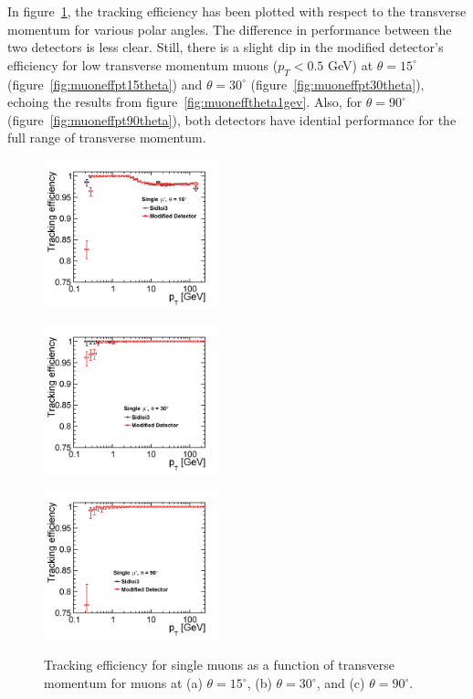 In figure~\ref{fig:muoneffpt}, the tracking efficiency has been plotted
with respect to the transverse momentum for various polar angles.
The difference in performance between the two detectors
is less clear.
Still, there is a slight dip in the modified detector's efficiency for low
transverse momentum muons ($p_{T} < 0.5$ GeV) at $\theta = 15^{\circ}$ (figure~\ref{fig:muoneffpt15theta})
and $\theta = 30^{\circ}$ (figure~\ref{fig:muoneffpt30theta}), echoing the results from figure~\ref{fig:muonefftheta1gev}.
Also, for $\theta = 90^{\circ}$ (figure~\ref{fig:muoneffpt90theta}), both detectors have idential performance for the full range of transverse momentum.
\begin{figure}[h!]
\begin{minipage}{.33\textwidth}
\centering
\includegraphics[width=2.0in]{muonEfficiencyPtComparisonTheta15.png}
\label{fig:muoneffpt15theta}
\end{minipage}%
\begin{minipage}{.33\textwidth}
\centering
\includegraphics[width=2.0in]{muonEfficiencyPtComparisonTheta30.png}
\label{fig:muoneffpt30theta}
\end{minipage}
\begin{minipage}{.33\textwidth}
\centering
\includegraphics[width=2.0in]{muonEfficiencyPtComparisonTheta90.png}
\label{fig:muoneffpt90theta}
\end{minipage}
\caption{Tracking efficiency for single muons as a function of transverse momentum
for muons at (a) $\theta = 15^{\circ}$, (b) $\theta = 30^{\circ}$, and (c) $\theta = 90^{\circ}$.}
\label{fig:muoneffpt}
\end{figure}


